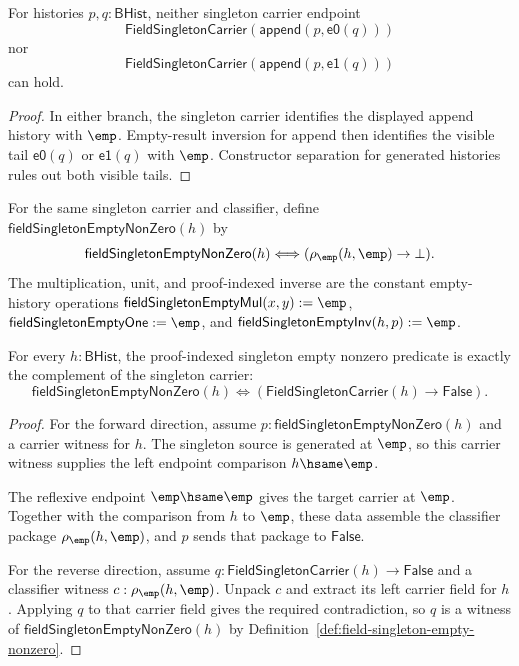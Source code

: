 \begin{theorem}
\label{thm:field-singleton-carrier-append-visible-tail-absurd}
For histories $p,q:\mathsf{BHist}$, neither singleton carrier endpoint
$$
\mathsf{FieldSingletonCarrier}(\mathsf{append}(p,\mathsf{e0}(q)))
$$
nor
$$
\mathsf{FieldSingletonCarrier}(\mathsf{append}(p,\mathsf{e1}(q)))
$$
can hold.
\end{theorem}
\begin{proof}
In either branch, the singleton carrier identifies the displayed append
history with $\emp$. Empty-result inversion for append then identifies the
visible tail $\mathsf{e0}(q)$ or $\mathsf{e1}(q)$ with $\emp$. Constructor
separation for generated histories rules out both visible tails.
\end{proof}

\begin{definition}
\label{def:field-singleton-empty-nonzero}
For the same singleton carrier and classifier, define
$\mathsf{fieldSingletonEmptyNonZero}(h)$ by
$$
\mathsf{fieldSingletonEmptyNonZero}(h)\Longleftrightarrow
(\rho_{\emp}(h,\emp)\to\bot).
$$
The multiplication, unit, and proof-indexed inverse are the constant
empty-history operations
$\mathsf{fieldSingletonEmptyMul}(x,y):=\emp$,
$\mathsf{fieldSingletonEmptyOne}:=\emp$, and
$\mathsf{fieldSingletonEmptyInv}(h,p):=\emp$.
\end{definition}

\begin{theorem}
\label{thm:field-singleton-empty-nonzero-carrier-complement}
For every $h:\mathsf{BHist}$, the proof-indexed singleton empty nonzero
predicate is exactly the complement of the singleton carrier:
$$
\mathsf{fieldSingletonEmptyNonZero}(h)
\Longleftrightarrow
(\mathsf{FieldSingletonCarrier}(h)\to\mathsf{False}).
$$
\end{theorem}
\begin{proof}
For the forward direction, assume
$p:\mathsf{fieldSingletonEmptyNonZero}(h)$ and a carrier witness for $h$. The
singleton source is generated at $\emp$, so this carrier witness supplies the
left endpoint comparison $h\hsame\emp$.

The reflexive endpoint $\emp\hsame\emp$ gives the target carrier at $\emp$.
Together with the comparison from $h$ to $\emp$, these data assemble the
classifier package $\rho_{\emp}(h,\emp)$, and $p$ sends that package to
$\mathsf{False}$.

For the reverse direction, assume
$q:\mathsf{FieldSingletonCarrier}(h)\to\mathsf{False}$ and a classifier witness
$c:\rho_{\emp}(h,\emp)$. Unpack $c$ and extract its left carrier field for $h$.
Applying $q$ to that carrier field gives the required contradiction, so
$q$ is a witness of $\mathsf{fieldSingletonEmptyNonZero}(h)$ by
Definition~\ref{def:field-singleton-empty-nonzero}.
\end{proof}

